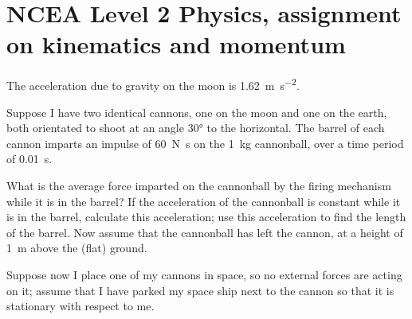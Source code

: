 \documentclass[answers]{exam}
\begin{document}
\section*{NCEA Level 2 Physics, assignment on kinematics and momentum}

The acceleration due to gravity on the moon is \SI{1.62}{\metre\per\second\squared}.

Suppose I have two identical cannons, one on the moon and one on the earth, both orientated to shoot at an angle \ang{30}
to the horizontal. The barrel of each cannon imparts an impulse of \SI{60}{\newton\second}
on the \SI{1}{\kilo\gram} cannonball, over a time period of \SI{0.01}{\second}.

\begin{questions}
  \question What is the average force imparted on the cannonball by the firing mechanism while it is in the barrel?
  \question If the acceleration of the cannonball is constant while it is in the barrel,
            calculate this acceleration; use this acceleration to find the length of the barrel.
  \question Now assume that the cannonball has left the cannon, at a height of \SI{1}{\metre}
            above the (flat) ground.
  \question Suppose now I place one of my cannons in space, so no external forces are acting on it; assume
            that I have parked my space ship next to the cannon so that it is stationary with respect to me.


\end{questions}
\end{document}
